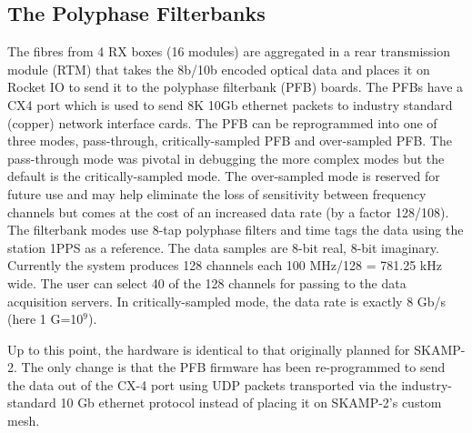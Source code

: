 \subsection{The Polyphase Filterbanks}
The fibres from 4 RX boxes (16 modules) are aggregated in a rear transmission module (RTM) that takes the 8b/10b encoded optical data and places it on Rocket IO to send it to the polyphase filterbank (PFB) boards. The PFBs have a CX4 port which is used to send 8K 10Gb ethernet packets to industry standard (copper) network interface cards. The PFB can be reprogrammed into one of three modes, pass-through, critically-sampled PFB and over-sampled PFB. The pass-through mode was pivotal in debugging the more complex modes but the default is the critically-sampled mode. The over-sampled mode is reserved for future use and may help eliminate the loss of sensitivity between frequency channels but comes at the cost of an increased data rate (by a factor 128/108). The filterbank modes use 8-tap polyphase filters and time tags the data using the station 1PPS as a reference. The data samples are 8-bit real, 8-bit imaginary. Currently the system produces 128 channels each 100 MHz/128 = 781.25 kHz wide. The user can select 40 of the 128 channels for passing to the data acquisition servers. In critically-sampled mode, the data rate is exactly 8 Gb/s (here 1 G=10$^9$).

Up to this point, the hardware is identical to that originally planned for SKAMP-2. The only change is that the PFB firmware has been re-programmed to send the data out of the CX-4 port using UDP packets transported via the industry-standard 10 Gb ethernet protocol instead of placing it on SKAMP-2's custom mesh.


  